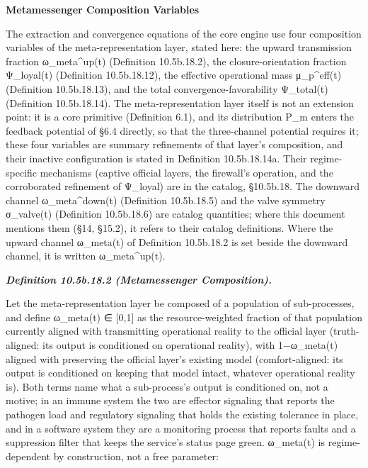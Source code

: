 \documentclass[
]{article}
\begin{document}
\textbf{Metamessenger Composition Variables}

The extraction and convergence equations of the core engine use four
composition variables of the meta-representation layer, stated here: the
upward transmission fraction ω\_meta\^{}up(t) (Definition 10.5b.18.2),
the closure-orientation fraction Ψ\_loyal(t) (Definition 10.5b.18.12),
the effective operational mass μ\_p\^{}eff(t) (Definition 10.5b.18.13),
and the total convergence-favorability Ψ\_total(t) (Definition
10.5b.18.14). The meta-representation layer itself is not an extension
point: it is a core primitive (Definition 6.1), and its distribution
P\_m enters the feedback potential of §6.4 directly, so that the
three-channel potential requires it; these four variables are summary
refinements of that layer's composition, and their inactive
configuration is stated in Definition 10.5b.18.14a. Their
regime-specific mechanisms (captive official layers, the firewall's
operation, and the corroborated refinement of Ψ\_loyal) are in the
catalog, §10.5b.18. The downward channel ω\_meta\^{}down(t) (Definition
10.5b.18.5) and the valve symmetry σ\_valve(t) (Definition 10.5b.18.6)
are catalog quantities; where this document mentions them (§14, §15.2),
it refers to their catalog definitions. Where the upward channel
ω\_meta(t) of Definition 10.5b.18.2 is set beside the downward channel,
it is written ω\_meta\^{}up(t).

\emph{\textbf{Definition 10.5b.18.2 (Metamessenger Composition).}}

Let the meta-representation layer be composed of a population of
sub-processes, and define ω\_meta(t) ∈ {[}0,1{]} as the
resource-weighted fraction of that population currently aligned with
transmitting operational reality to the official layer (truth-aligned:
its output is conditioned on operational reality), with 1−ω\_meta(t)
aligned with preserving the official layer's existing model
(comfort-aligned: its output is conditioned on keeping that model
intact, whatever operational reality is). Both terms name what a
sub-process's output is conditioned on, not a motive; in an immune
system the two are effector signaling that reports the pathogen load and
regulatory signaling that holds the existing tolerance in place, and in
a software system they are a monitoring process that reports faults and
a suppression filter that keeps the service's status page green.
ω\_meta(t) is regime-dependent by construction, not a free parameter:
\end{document}
